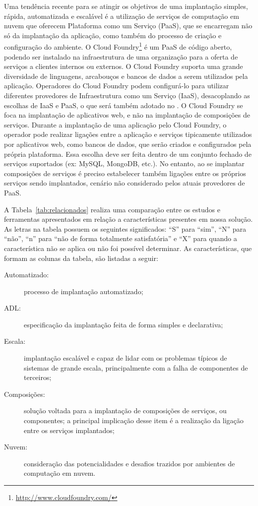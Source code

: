 Uma tendência recente para se atingir os objetivos de uma implantação simples, rápida, automatizada e escalável é a utilização de serviços de computação em nuvem que oferecem Plataforma como um Serviço (PaaS), que se encarregam não só da implantação da aplicação, como também do processo de criação e configuração do ambiente. O Cloud Foundry\footnote{\url{http://www.cloudfoundry.com/}} é um PaaS de código aberto, podendo ser instalado na infraestrutura de uma organização para a oferta de serviços a clientes internos ou externos. O Cloud Foundry suporta uma grande diversidade de linguagens, arcabouços e bancos de dados a serem utilizados pela aplicação. Operadores do Cloud Foundry podem configurá-lo para utilizar diferentes provedores de Infraestrutura como um Serviço (IaaS), desacoplando as escolhas de IaaS e PaaS, o que será também adotado no \ee. O Cloud Foundry se foca na implantação de aplicativos web, e não na implantação de composições de serviços. Durante a implantação de uma aplicação pelo Cloud Foundry, o operador pode realizar ligações entre a aplicação e serviços tipicamente utilizados por aplicativos web, como bancos de dados, que serão criados e configurados pela própria plataforma. Essa escolha deve ser feita dentro de um conjunto fechado de serviços suportados (ex: MySQL, MongoDB, etc.). No entanto, ao se implantar composições de serviços é preciso estabelecer também ligações entre os próprios serviços sendo implantados, cenário não considerado pelos atuais provedores de PaaS.

A Tabela~\ref{tab:relacionados} realiza uma comparação entre os estudos e ferramentas apresentados em relação a características presentes em nossa solução. As letras na tabela possuem os seguintes significados: ``S'' para ``sim'', ``N'' para ``não'', ``n'' para ``não de forma totalmente satisfatória'' e ``X'' para quando a característica não se aplica ou não foi possível determinar. As características, que formam as colunas da tabela, são listadas a seguir:

\begin{description}
\item [Automatizado:] processo de implantação automatizado;
\item [ADL:] especificação da implantação feita de forma simples e declarativa;
\item [Escala:] implantação escalável e capaz de lidar com os problemas típicos de sistemas de grande escala, principalmente com a falha de componentes de terceiros;
\item [Composições:] solução voltada para a implantação de composições de serviços, ou componentes; a principal implicação desse item é a realização da ligação entre os serviços implantados;
\item [Nuvem:] consideração das potencialidades e desafios trazidos por ambientes de computação em nuvem.
\end{description}

